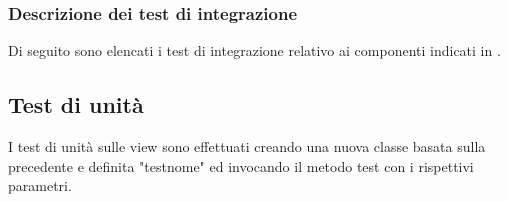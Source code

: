 \subsubsection{Descrizione dei test di integrazione}
Di seguito sono elencati i test di integrazione relativo ai componenti indicati in \infoST.
\subsection{Test di unità}
I test di unità sulle view sono effettuati creando una nuova classe basata sulla precedente e definita "testnome" ed invocando il metodo test con i rispettivi parametri.




